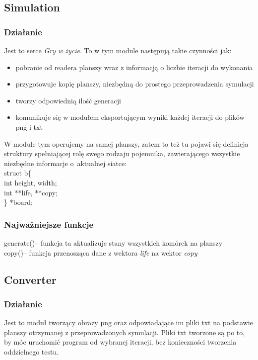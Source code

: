 \documentclass{article}
\begin{document}
\subsection{Simulation}
\subsubsection{Działanie}
Jest to serce \textit{Gry w życie}. To w tym module następują takie czynności jak:
\begin{itemize}
  \item pobranie od readera planszy wraz z informacją o liczbie iteracji do wykonania
  \item przygotowuje kopię planszy, niezbędną do prostego przeprowadzenia symulacji
  \item tworzy odpowiednią ilość generacji
  \item komunikuje się w modułem eksportującym wyniki każdej iteracji do plików png i txt
\end{itemize}
W module tym operujemy na samej planszy, zatem to też tu pojawi się definicja struktury
spełniającej rolę swego rodzaju pojemnika, zawierającego wszystkie niezbędne informacje
o~aktualnej siatce:\\
{\selectfont
struct b\{ \\
int height, width;\\
int **life, **copy;\\
\} *board;}

\subsubsection{Najważniejsze funkcje}
{\selectfont generate()}-- funkcja ta aktualizuje stany wszystkich komórek
na planszy\\
{\selectfont copy()}-- funkcja przenosząca dane z wektora \textit{life} na
wektor \textit{copy}\\

\subsection{Converter}
\subsubsection{Działanie}
Jest to moduł tworzący obrazy png oraz odpowiadające im pliki txt na podstawie planszy otrzymanej
z przeprowadzonych symulacji. Pliki txt tworzone są po to, by móc uruchomić program od wybranej
iteracji, bez konieczności tworzenia oddzielnego testu.
\end{document}
